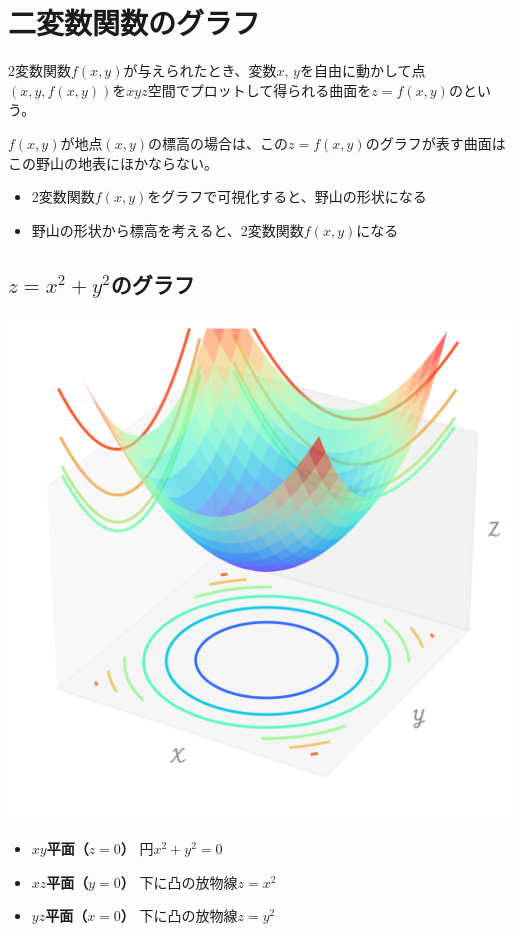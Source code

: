 \documentclass[../../../topic_calculus]{subfiles}
\begin{document}
\sectionline
\section{二変数関数のグラフ}

2変数関数$f(x, y)$が与えられたとき、変数$x,\,y$を自由に動かして点$(x, y, f(x,y))$を$xyz$空間でプロットして得られる曲面を$z= f(x, y)$のという。

\br

$f(x,y)$が地点$(x, y)$の標高の場合は、この$z=f(x,y)$のグラフが表す曲面はこの野山の地表にほかならない。
\begin{itemize}
  \item 2変数関数$f(x, y)$をグラフで可視化すると、野山の形状になる
  \item 野山の形状から標高を考えると、2変数関数$f(x, y)$になる
\end{itemize}

\subsection{$z = x^2 + y^2$のグラフ}

\includegraphics{../python/graph_x-pow2-add-y-pow2_01.png}

\begin{itemize}
  \item {\bfseries $xy$平面（$z=0$）} 円$x^2 + y^2 =0$
  \item {\bfseries $xz$平面（$y=0$）} 下に凸の放物線$z=x^2$
  \item {\bfseries $yz$平面（$x=0$）} 下に凸の放物線$z=y^2$
\end{itemize}
\end{document}
